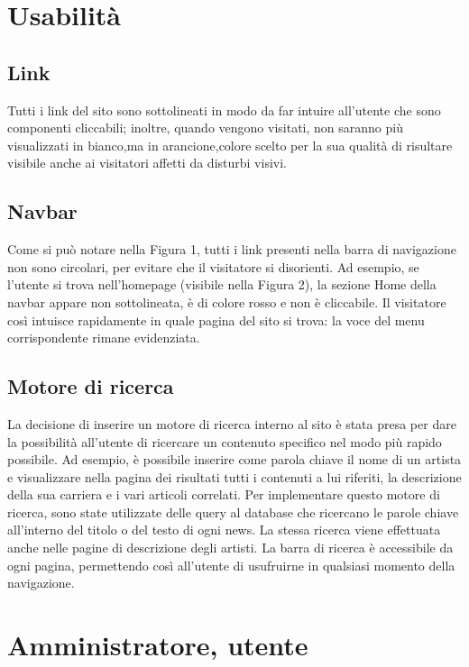 \documentclass[10pt, a4paper]{article}
\begin{document}
\section{Usabilità}

\subsection{Link}
Tutti i link del sito sono sottolineati in modo da far intuire all'utente che sono componenti cliccabili; inoltre, quando vengono visitati, non saranno più visualizzati in bianco,ma in arancione,colore scelto per la sua qualità di risultare visibile anche ai visitatori affetti da disturbi visivi.

\subsection{Navbar}
Come si può notare nella Figura 1, tutti i link presenti nella barra di navigazione non sono circolari, per evitare che il visitatore si disorienti. Ad esempio, se l'utente si trova nell'homepage (visibile nella Figura 2), la sezione Home della navbar appare non sottolineata, è di colore rosso e non è cliccabile. Il visitatore così intuisce rapidamente in quale pagina del sito si trova: la voce del menu corrispondente rimane evidenziata. 

\subsection{Motore di ricerca}
La decisione di inserire un motore di ricerca interno al sito è stata presa per dare la possibilità all’utente di ricercare un contenuto specifico nel modo più rapido possibile.
Ad esempio, è possibile inserire come parola chiave il nome di un artista e visualizzare nella pagina dei risultati tutti i contenuti a lui riferiti, la descrizione della sua carriera e i vari articoli correlati.
Per implementare questo motore di ricerca, sono state utilizzate delle query al database che ricercano le parole chiave all’interno del titolo o del testo di ogni news. La stessa ricerca viene effettuata anche nelle pagine di descrizione degli artisti.
La barra di ricerca è accessibile da ogni pagina, permettendo così all’utente di usufruirne in qualsiasi momento della navigazione.


\section{Amministratore, utente}
\end{document}
